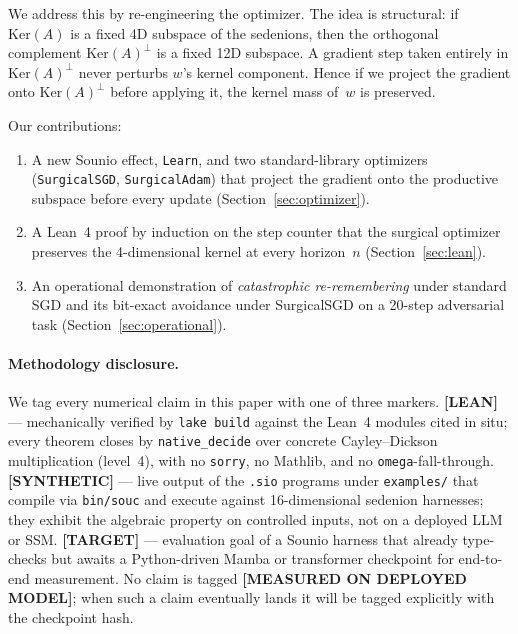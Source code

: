 \documentclass{article}
\begin{document}
We address this by re-engineering the optimizer.  The idea is
structural: if $\mathrm{Ker}(A)$ is a fixed 4D subspace of the
sedenions, then the orthogonal complement $\mathrm{Ker}(A)^\perp$
is a fixed 12D subspace.  A gradient step taken entirely in
$\mathrm{Ker}(A)^\perp$ never perturbs $w$'s kernel component.
Hence if we project the gradient onto $\mathrm{Ker}(A)^\perp$
before applying it, the kernel mass of~$w$ is preserved.

Our contributions:

\begin{enumerate}
  \item A new Sounio effect, \texttt{Learn}, and two standard-library
        optimizers (\texttt{SurgicalSGD}, \texttt{SurgicalAdam}) that
        project the gradient onto the productive subspace before
        every update (Section~\ref{sec:optimizer}).
  \item A Lean~4 proof by induction on the step counter that the
        surgical optimizer preserves the 4-dimensional kernel at
        every horizon~$n$ (Section~\ref{sec:lean}).
  \item An operational demonstration of \emph{catastrophic
        re-remembering} under standard SGD and its bit-exact
        avoidance under SurgicalSGD on a 20-step adversarial
        task (Section~\ref{sec:operational}).
\end{enumerate}

\paragraph{Methodology disclosure.}
We tag every numerical claim in this paper with one of three markers.
\textbf{[LEAN]} --- mechanically verified by \texttt{lake build} against
the Lean~4 modules cited in situ; every theorem closes by
\texttt{native\_decide} over concrete Cayley--Dickson multiplication
(level~4), with no \texttt{sorry}, no Mathlib, and no \texttt{omega}-fall-through.
\textbf{[SYNTHETIC]} --- live output of the \texttt{.sio} programs under
\texttt{examples/} that compile via \texttt{bin/souc} and execute against
16-dimensional sedenion harnesses; they exhibit the algebraic property on
controlled inputs, not on a deployed LLM or SSM.
\textbf{[TARGET]} --- evaluation goal of a Sounio harness that already
type-checks but awaits a Python-driven Mamba or transformer checkpoint
for end-to-end measurement.
No claim is tagged \textbf{[MEASURED ON DEPLOYED MODEL]}; when such a claim
eventually lands it will be tagged explicitly with the checkpoint hash.
\end{document}
